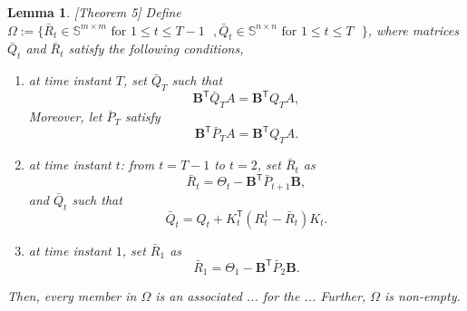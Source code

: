 \documentclass{article}
\newcommand{\transpose}{\mathsf{T}}
\newtheorem{lemma}{Lemma}
\begin{document}
\begin{lemma}
    \cite{prasad_structure_2023}[Theorem 5]
    Define $\Omega := \{\bar{R}_{t}\in \mathbb{S}^{m\times m}\text{ for $1\leq t \leq T-1$ },\bar{Q}_{t}\in\mathbb{S}^{n\times n}\text{ for $1\leq t \leq T$ } \}$, where matrices $\bar{Q}_{t}$ and $\bar{R}_{t}$ satisfy the following conditions,
    \begin{enumerate}
        \item at time instant $T$, set $\bar{Q}_{T}$ such that
        \begin{equation}
            \mathbf{B}^{\transpose}\bar{Q}_{T}A = \mathbf{B}^{\transpose}Q_{T}A,
        \end{equation}
        Moreover, let $\bar{P}_{T}$ satisfy
        \begin{equation}
            \mathbf{B}^{\transpose}\bar{P}_{T}A = \mathbf{B}^{\transpose}Q_{T}A.
        \end{equation}
        \item at time instant $t$: from $t=T-1$ to $t=2$, set $\bar{R}_{t}$ as
        \begin{equation}\label{eq:matrixR}
            \bar{R}_{t} = \Theta_{t} - \mathbf{B}^{\transpose}\bar{P}_{t+1}\mathbf{B},
        \end{equation}
        and $\bar{Q}_{t}$ such that
        \begin{equation}
            \bar{Q}_{t} = Q_{t} + K_{t}^{\transpose}(R_{t}^{1}-\bar{R}_{t})K_{t}.
        \end{equation}
        \item at time instant $1$, set $\bar{R}_{1}$ as 
        \begin{equation}
            \bar{R}_{1} = \Theta_{1}-\mathbf{B}^{\transpose}\bar{P}_{2}\mathbf{B}.
        \end{equation}
    \end{enumerate}
    Then, every member in $\Omega$ is an associated ... for the ... Further, $\Omega$ is non-empty.
\end{lemma}
\end{document}
